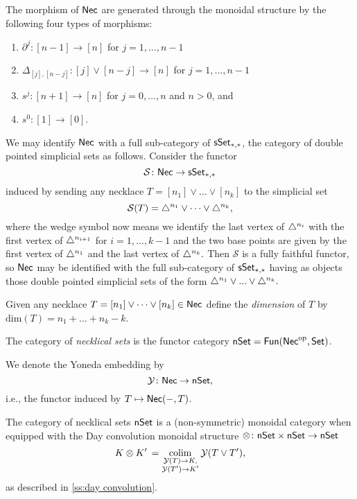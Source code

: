 The morphism of $\mathsf{Nec}$ are generated through the monoidal structure by the following four types of morphisms:
\begin{enumerate}
	\item $\partial^j \colon [n-1] \to [n]$ for $j = 1, \dots, n-1$
	\item $\Delta_{[j], [n-j]} \colon  [j] \vee [n-j] \to [n]$ for $j = 1, \dots, n-1$
	\item $s^j \colon [n+1] \to [n]$ for $j = 0, \dots, n$ and $n>0$, and 
	\item $s^0 \colon [1] \to [0]$.
\end{enumerate}
We may identify $\mathsf{Nec}$ with a full sub-category of $\mathsf{sSet}_{*,*}$, the category of double pointed simplicial sets as follows. Consider the functor
\begin{equation*}
\mathcal{S} \colon \mathsf{Nec} \to \mathsf{sSet}_{*,*}
\end{equation*}
 induced by sending any necklace $T = [n_1] \vee \dots \vee[n_k]$ to the simplicial set
\begin{equation*}
\mathcal{S}(T)= \triangle^{n_1} \vee\dots \vee \triangle^{n_k},
\end{equation*}
where the wedge symbol now means we identify the last vertex of $\triangle^{n_i}$ with the first vertex of $\triangle^{n_{i+1}}$ for $i = 1, \dots, k-1$ and the two base points are given by the first vertex of $\triangle^{n_1}$ and the last vertex of $\triangle^{n_k}.$
Then $\mathcal{S}$ is a fully faithful functor, so $\mathsf{Nec}$ may be identified with the full sub-category of $\mathsf{sSet}_{*,*}$ having as objects those double pointed simplicial sets of the form $\triangle^{n_1} \vee ... \vee \triangle^{n_k}.$

Given any necklace $T = [n_1] \vee \dots \vee[n_k] \in \mathsf{Nec}$ define the \textit{dimension} of $T$ by $\text{dim}(T)=n_1 + \dots + n_k-k$.

The category of \textit{necklical sets} is the functor category $\mathsf{nSet} = \mathsf{Fun}(\mathsf{Nec}^{\mathrm{op}}, \mathsf{Set})$.

We denote the Yoneda embedding by
$$\mathcal{Y} \colon \mathsf{Nec} \to \mathsf{nSet},$$
i.e., the functor induced by $T \mapsto \mathsf{Nec}(-,T)$.

The category of necklical sets $\mathsf{nSet}$ is a (non-symmetric) monoidal category when equipped with the Day convolution monoidal structure $\otimes \colon \mathsf{nSet} \times \mathsf{nSet} \to \mathsf{nSet}$
\begin{equation*}
K \otimes K' \, = \operatorname*{colim}_{\substack{\mathcal{Y}(T) \to K, \\ \mathcal{Y}(T')\to K'}} \mathcal{Y}(T \vee T'),
\end{equation*}
as described in \cref{ss:day convolution}.

